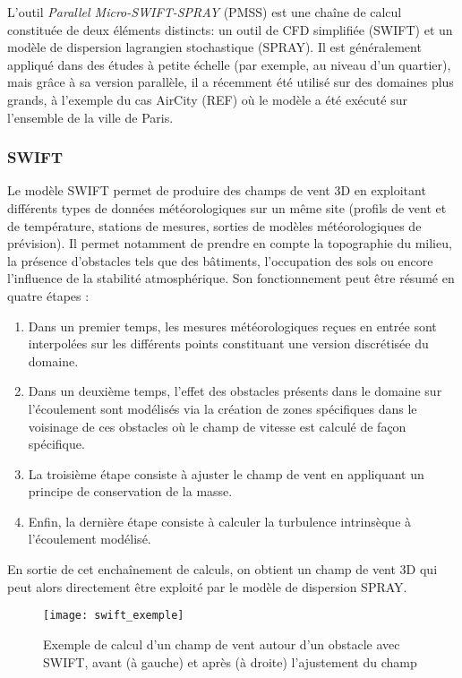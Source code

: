 L'outil \textit{Parallel Micro-SWIFT-SPRAY} (PMSS) est une chaîne de calcul constituée de deux éléments distincts: un outil de CFD simplifiée (SWIFT) et un modèle de dispersion lagrangien stochastique (SPRAY). Il est généralement appliqué dans des études à petite échelle (par exemple, au niveau d'un quartier), mais grâce à sa version parallèle, il a récemment été utilisé sur des domaines plus grands, à l'exemple du cas AirCity (REF) où le modèle a été exécuté sur l'ensemble de la ville de Paris.\\

\subsubsection{SWIFT}

Le modèle SWIFT permet de produire des champs de vent 3D en exploitant différents types de données météorologiques sur un même site (profils de vent et de température, stations de mesures, sorties de modèles météorologiques de prévision). Il permet notamment de prendre en compte la topographie du milieu, la présence d'obstacles tels que des bâtiments, l'occupation des sols ou encore l'influence de la stabilité atmosphérique. Son fonctionnement peut être résumé en quatre étapes :  \\

\begin{enumerate}
	\item Dans un premier temps, les mesures météorologiques reçues en entrée sont interpolées sur les différents points constituant une version discrétisée du domaine.
	\item Dans un deuxième temps, l'effet des obstacles présents dans le domaine sur l'écoulement sont modélisés via la création de zones spécifiques dans le voisinage de ces obstacles où le champ de vitesse est calculé de façon spécifique.
	\item La troisième étape consiste à ajuster le champ de vent en appliquant un principe de conservation de la masse.
	\item Enfin, la dernière étape consiste à calculer la turbulence intrinsèque à l'écoulement modélisé.\\
\end{enumerate}

En sortie de cet enchaînement de calculs, on obtient un champ de vent 3D qui peut alors directement être exploité par le modèle de dispersion SPRAY.

\begin{figure}
	\centering
	\texttt{[image: swift\_exemple]}
	\caption{Exemple de calcul d'un champ de vent autour d'un obstacle avec SWIFT, avant (à gauche) et après (à droite) l'ajustement du champ}
	\label{fig_swift_exemple}
\end{figure}

